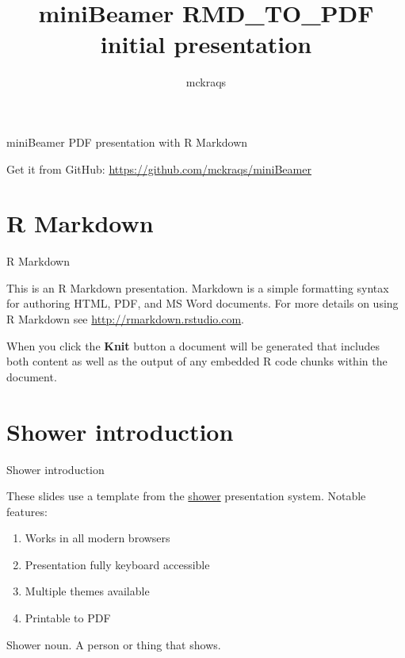 \documentclass[ignorenonframetext,]{beamer}
\title{miniBeamer RMD\_TO\_PDF initial presentation}
\author{mckraqs}
\date{}
\providecommand{\tightlist}{%
  \setlength{\itemsep}{0pt}\setlength{\parskip}{0pt}}
\begin{document}
\frame{\titlepage}


\section[]{}

\begin{frame}{miniBeamer PDF presentation with R Markdown}
\protect\hypertarget{minibeamer-pdf-presentation-with-r-markdown}{}

Get it from GitHub: \url{https://github.com/mckraqs/miniBeamer}

\end{frame}

\hypertarget{r-markdown}{%
\section{R Markdown}\label{r-markdown}}

\begin{frame}{R Markdown}
\protect\hypertarget{r-markdown-1}{}

This is an R Markdown presentation. Markdown is a simple formatting
syntax for authoring HTML, PDF, and MS Word documents. For more details
on using R Markdown see \url{http://rmarkdown.rstudio.com}.

When you click the \textbf{Knit} button a document will be generated
that includes both content as well as the output of any embedded R code
chunks within the document.

\end{frame}

\hypertarget{shower-introduction}{%
\section{Shower introduction}\label{shower-introduction}}

\begin{frame}{Shower introduction}
\protect\hypertarget{shower-introduction-1}{}

These slides use a template from the
\href{https://github.com/shower/shower}{shower} presentation system.
Notable features:

\begin{enumerate}
\tightlist
\item
  Works in all modern browsers
\item
  Presentation fully keyboard accessible
\item
  Multiple themes available
\item
  Printable to PDF
\end{enumerate}

Shower noun. A person or thing that shows.

\end{frame}
\end{document}

